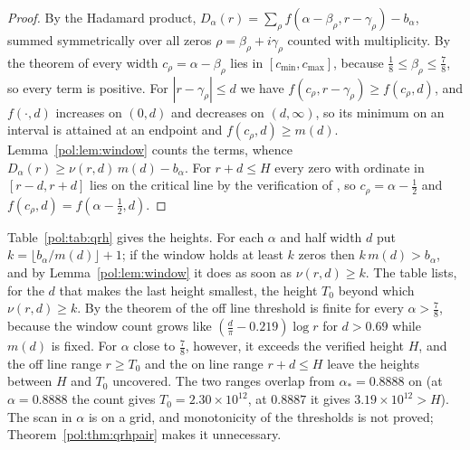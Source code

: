 \begin{proof}
By the Hadamard product, $D_\alpha(r)=\sum_\rho f(\alpha-\beta_\rho,r-\gamma_\rho)-b_\alpha$, summed symmetrically over all zeros $\rho=\beta_\rho+i\gamma_\rho$ counted with multiplicity. By the theorem of \cite{OAI26a} every width $c_\rho=\alpha-\beta_\rho$ lies in $[c_{\min},c_{\max}]$, because $\frac18\le\beta_\rho\le\frac78$, so every term is positive. For $|r-\gamma_\rho|\le d$ we have $f(c_\rho,r-\gamma_\rho)\ge f(c_\rho,d)$, and $f(\cdot,d)$ increases on $(0,d)$ and decreases on $(d,\infty)$, so its minimum on an interval is attained at an endpoint and $f(c_\rho,d)\ge m(d)$. Lemma~\ref{pol:lem:window} counts the terms, whence $D_\alpha(r)\ge\nu(r,d)\,m(d)-b_\alpha$. For $r+d\le H$ every zero with ordinate in $[r-d,r+d]$ lies on the critical line by the verification of \cite{PT21}, so $c_\rho=\alpha-\frac12$ and $f(c_\rho,d)=f(\alpha-\frac12,d)$.
\end{proof}

Table~\ref{pol:tab:qrh} gives the heights. For each $\alpha$ and half width $d$ put $k=\lfloor b_\alpha/m(d)\rfloor+1$; if the window holds at least $k$ zeros then $k\,m(d)>b_\alpha$, and by Lemma~\ref{pol:lem:window} it does as soon as $\nu(r,d)\ge k$. The table lists, for the $d$ that makes the last height smallest, the height $T_0$ beyond which $\nu(r,d)\ge k$. By the theorem of \cite{OAI26a} the off line threshold is finite for every $\alpha>\frac78$, because the window count grows like $(\frac d\pi-0.219)\log r$ for $d>0.69$ while $m(d)$ is fixed. For $\alpha$ close to $\frac78$, however, it exceeds the verified height $H$, and the off line range $r\ge T_0$ and the on line range $r+d\le H$ leave the heights between $H$ and $T_0$ uncovered. The two ranges overlap from $\alpha_*=0.8888$ on (at $\alpha=0.8888$ the count gives $T_0=2.30\times10^{12}$, at $0.8887$ it gives $3.19\times10^{12}>H$). The scan in $\alpha$ is on a grid, and monotonicity of the thresholds is not proved; Theorem~\ref{pol:thm:qrhpair} makes it unnecessary.

\begin{table}[ht]
\centering\small
{}
\caption{Heights beyond which Theorem~\ref{pol:thm:qrhcomp} guarantees the compensated clock inequality, rounded up, with the half width $d$ of the window and the number $k$ of zeros that the proof asks for in it. ``Off line'' uses only $\frac18\le\beta\le\frac78$; ``on line'' uses $\beta=\frac12$, valid for $r+d\le H$. Computed with the bound of Lemma~\ref{pol:lem:window}.}\label{pol:tab:qrh}
\end{table}

